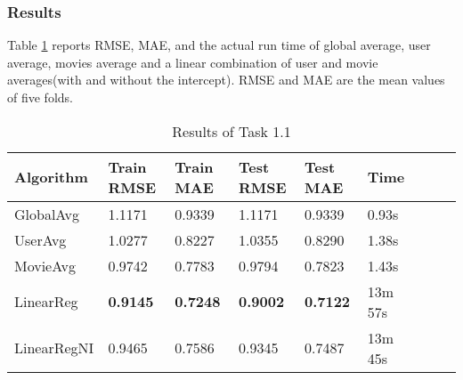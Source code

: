 \documentclass[12pt]{article}
\begin{document}
\subsubsection{Results}
Table \ref{tab:1.1-results} reports RMSE, MAE, and the actual run time of global average, user average, movies average and a linear combination of user and movie averages(with and without the intercept). RMSE and MAE are the mean values of five folds.
\begin{table}[ht]
    \centering
    \caption{Results of Task 1.1}
    \label{tab:1.1-results}
    \begin{threeparttable}
    \begin{tabular}{lllllllll}
        \toprule
        \textbf{Algorithm}  & \textbf{Train RMSE} & \textbf{Train MAE} & \textbf{Test RMSE} & \textbf{Test MAE} & \textbf{Time}\\
        \midrule
        GlobalAvg & 1.1171 & 0.9339 & 1.1171 & 0.9339 & 0.93s\\
        UserAvg & 1.0277 & 0.8227 & 1.0355 & 0.8290 & 1.38s\\
        MovieAvg & 0.9742 & 0.7783 & 0.9794 & 0.7823 & 1.43s\\
        LinearReg & \textbf{0.9145} & \textbf{0.7248} & \textbf{0.9002} & \textbf{0.7122} & 13m 57s\\
        LinearRegNI & 0.9465 & 0.7586 & 0.9345 & 0.7487 & 13m 45s\\
        \bottomrule
    \end{tabular}
    \end{threeparttable}
\end{table}
\end{document}
